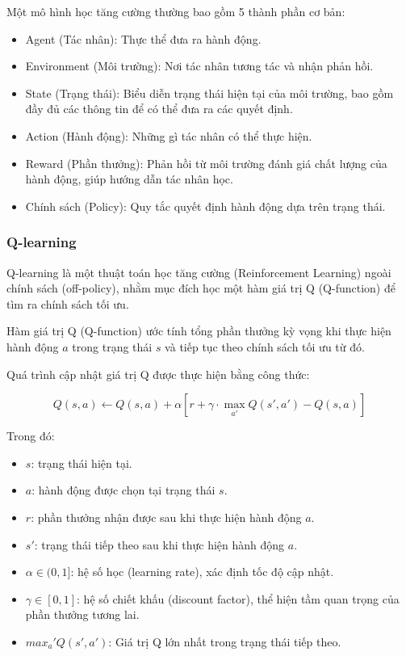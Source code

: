 Một mô hình học tăng cường thường bao gồm 5 thành phần cơ bản:
\begin{itemize}
    \item Agent (Tác nhân): Thực thể đưa ra hành động.
    \item Environment (Môi trường): Nơi tác nhân tương tác và nhận phản hồi.
    \item State (Trạng thái): Biểu diễn trạng thái hiện tại của môi trường, bao gồm đầy đủ các thông tin để có thể đưa ra các quyết định.
    \item Action (Hành động): Những gì tác nhân có thể thực hiện.
    \item Reward (Phần thưởng): Phản hồi từ môi trường đánh giá chất lượng của hành động, giúp hướng dẫn tác nhân học.
    \item Chính sách (Policy): Quy tắc quyết định hành động dựa trên trạng thái.
\end{itemize}

\subsubsection{Q-learning}

Q-learning là một thuật toán học tăng cường (Reinforcement Learning) ngoài chính sách (off-policy), nhằm mục đích học một hàm giá trị Q (Q-function) để tìm ra chính sách tối ưu.

Hàm giá trị Q (Q-function) ước tính tổng phần thưởng kỳ vọng khi thực hiện hành động $a$ trong trạng thái $s$ và tiếp tục theo chính sách tối ưu từ đó.

Quá trình cập nhật giá trị Q được thực hiện bằng công thức:

\[
    Q(s, a) \leftarrow Q(s, a) + \alpha \left[ r + \gamma \cdot \max_{a'} Q(s', a') - Q(s, a) \right]
\]

Trong đó:
\begin{itemize}
    \item $s$: trạng thái hiện tại.
    \item $a$: hành động được chọn tại trạng thái $s$.
    \item $r$: phần thưởng nhận được sau khi thực hiện hành động $a$.
    \item $s'$: trạng thái tiếp theo sau khi thực hiện hành động $a$.
    \item $\alpha \in (0,1]$: hệ số học (learning rate), xác định tốc độ cập nhật.
    \item $\gamma \in [0,1]$: hệ số chiết khấu (discount factor), thể hiện tầm quan trọng của phần thưởng tương lai.
    \item $max_a' Q(s', a')$: Giá trị Q lớn nhất trong trạng thái tiếp theo.
\end{itemize}

